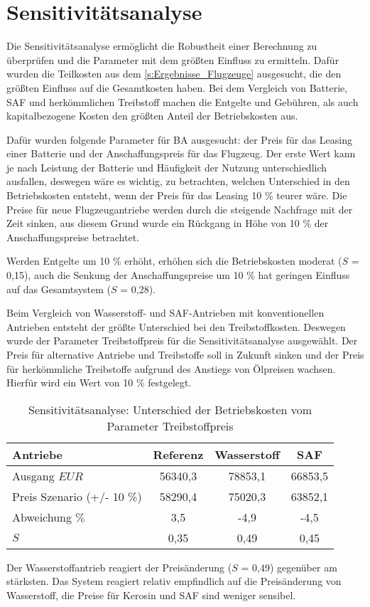 \section{Sensitivitätsanalyse}
\label{s:Sensitivitätsanalyse}
%
Die Sensitivitätsanalyse ermöglicht die Robustheit einer Berechnung zu überprüfen 
und die Parameter mit dem größten Einfluss zu ermitteln. 
Dafür wurden die Teilkosten aus dem \ref{s:Ergebnisse_Flugzeuge} ausgesucht, 
die den größten Einfluss auf die Gesamtkosten haben. 
Bei dem Vergleich von Batterie, SAF und herkömmlichen Treibstoff 
machen die Entgelte und Gebühren, als auch kapitalbezogene Kosten den größten Anteil der Betriebskosten aus. %

Dafür wurden folgende Parameter für BA ausgesucht: der Preis für das Leasing einer Batterie 
und der Anschaffungspreis für das Flugzeug.
Der erste Wert kann je nach Leistung der Batterie und Häufigkeit der Nutzung unterschiedlich ausfallen, 
deswegen wäre es wichtig, zu betrachten, welchen Unterschied in den Betriebskosten entsteht, 
wenn der Preis für das Leasing 10 \% teurer wäre. 
Die Preise für neue Flugzeugantriebe werden durch die steigende Nachfrage mit der Zeit sinken, 
aus diesem Grund wurde ein Rückgang in Höhe von 10 \% der Anschaffungspreise betrachtet.

Werden Entgelte um 10 \% erhöht, erhöhen sich die Betriebskosten moderat ($S$ = 0,15), 
auch die Senkung der Anschaffungspreise um 10 \% hat geringen Einfluss auf das Gesamtsystem ($S$ = 0,28).

Beim Vergleich von Wasserstoff- und SAF-Antrieben mit konventionellen Antrieben 
entsteht der größte Unterschied bei den Treibstoffkosten. 
Deswegen wurde der Parameter \glqq Treibstoffpreis\grqq{} für die Sensitivitätsanalyse ausgewählt.
Der Preis für alternative Antriebe und Treibstoffe soll in Zukunft sinken und der Preis 
für herkömmliche Treibstoffe aufgrund des Anstiegs von Ölpreisen wachsen. 
Hierfür wird ein Wert von 10 \% festgelegt.

\begin{table}[h]
	\begin{center}
    \caption{Sensitivitätsanalyse: Unterschied der Betriebskosten vom Parameter Treibstoffpreis}
	\label{sensiv}
	\begin{tabular}{|l|c|c|c|}
		\hline
		\textbf{Antriebe} & \textbf{Referenz}& \textbf{Wasserstoff}& \textbf{SAF} \\ \hline
		Ausgang $EUR$ & 56340,3 & 78853,1 & 66853,5  \\ \hline
        Preis Szenario (+/- 10 \%) & 58290,4  & 75020,3 & 63852,1 \\ \hline
        Abweichung $\%$ & 3,5 & -4,9 & -4,5 \\ \hline
		$S$ & 0,35 & 0,49 & 0,45 \\ \hline
	\end{tabular}
    \end{center}
\end{table}

Der Wasserstoffantrieb reagiert der Preisänderung ($S$ = 0,49) gegenüber am stärksten. 
Das System reagiert relativ empfindlich auf die Preisänderung von Wasserstoff, 
die Preise für Kerosin und SAF sind weniger sensibel.
